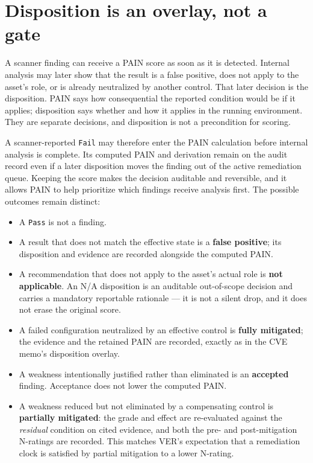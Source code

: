 \documentclass[11pt]{article}
\newcommand{\code}[1]{\texttt{#1}}
\begin{document}
\section{Disposition is an overlay, not a gate}
\label{sec:gate}
\begin{plain}
A scanner finding can receive a PAIN score as soon as it is detected. Internal
analysis may later show that the result is a false positive, does not apply to the
asset's role, or is already neutralized by another control. That later decision is
the disposition. PAIN says how consequential the reported condition would be if it
applies; disposition says whether and how it applies in the running environment.
They are separate decisions, and disposition is not a precondition for scoring.
\end{plain}

A scanner-reported \code{Fail} may therefore enter the PAIN calculation before
internal analysis is complete. Its computed PAIN and derivation remain on the audit
record even if a later disposition moves the finding out of the active remediation
queue. Keeping the score makes the decision auditable and reversible, and it allows
PAIN to help prioritize which findings receive analysis first. The possible outcomes
remain distinct:

\begin{itemize}[leftmargin=1.4em,nosep,topsep=3pt]
\item A \code{Pass} is not a finding.
\item A result that does not match the effective state is a \textbf{false positive};
  its disposition and evidence are recorded alongside the computed PAIN.
\item A recommendation that does not apply to the asset's actual role is
  \textbf{not applicable}. An N/A disposition is an auditable out-of-scope decision
  and carries a mandatory reportable rationale --- it is not a silent drop, and it
  does not erase the original score.
\item A failed configuration neutralized by an effective control is
  \textbf{fully mitigated}; the evidence and the retained PAIN are recorded, exactly
  as in the CVE memo's disposition overlay.
\item A weakness intentionally justified rather than eliminated is an
  \textbf{accepted} finding. Acceptance does not lower the computed PAIN.
\item A weakness reduced but not eliminated by a compensating control is
  \textbf{partially mitigated}: the grade and effect are re-evaluated against the
  \emph{residual} condition on cited evidence, and both the pre- and
  post-mitigation N-ratings are recorded. This matches VER's expectation that a
  remediation clock is satisfied by partial mitigation to a lower N-rating.
\end{itemize}
\end{document}
